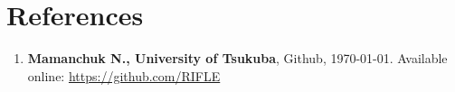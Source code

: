 \documentclass[12pt,a4paper]{article}
\begin{document}
\setlength{\fboxsep}{0pt} %
\setlength{\fboxrule}{0.5pt} %

\section*{References}
\begin{enumerate}
    \item \textbf{Mamanchuk N., University of Tsukuba}, Github, \today. Available online: \url{https://github.com/RIFLE}
\end{enumerate}
\end{document}
